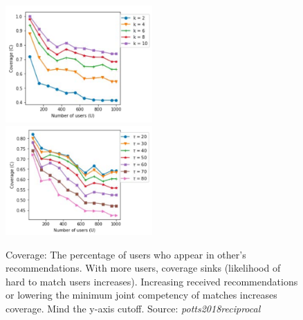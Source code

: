 \documentclass[nochapterpage,bigchapter,linedtoc,longdoc,colorback,accentcolor=tud3b,oneside]{tudreport}
\begin{document}
\begin{figure}[p]
	\includegraphics[width=0.5\textwidth]{g/CoverageUk.PNG}
	\includegraphics[width=0.5\textwidth]{g/CoverageUT.PNG}
	\caption{Coverage: The percentage of users who appear in other's recommendations. With more users, coverage sinks (likelihood of hard to match users increases). Increasing received recommendations or lowering the minimum joint competency of matches increases coverage. Mind the y-axis cutoff. Source: \textit{potts2018reciprocal}}
	\label{f:coverage}
\end{figure}
\end{document}
